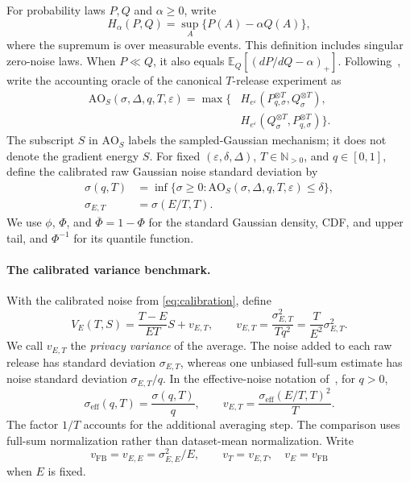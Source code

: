 \documentclass[11pt]{article}
\theoremstyle{remark}
\newcommand{\N}{\mathbb N}
\newcommand{\E}{\mathbb E}
\newcommand{\AO}{\mathrm{AO}}
\begin{document}
For probability laws $P,Q$ and $\alpha\geq0$, write
\[
 H_\alpha(P,Q)=\sup_A\{P(A)-\alpha Q(A)\},
\]
where the supremum is over measurable events. This definition includes
singular zero-noise laws. When $P\ll Q$, it also equals
$\E_Q[(dP/dQ-\alpha)_+]$. Following~\cite{raisa2024}, write the accounting
oracle of the canonical $T$-release experiment as
\begin{equation}\label{eq:canonical-accountant}
 \begin{split}
 \AO_S(\sigma,\Delta,q,T,\varepsilon)=\max\bigl\{&
 H_{e^\varepsilon}(P_{q,\sigma}^{\otimes T},Q_\sigma^{\otimes T}),\\
 &H_{e^\varepsilon}(Q_\sigma^{\otimes T},P_{q,\sigma}^{\otimes T})\bigr\}.
 \end{split}
\end{equation}
The subscript $S$ in $\AO_S$ labels the sampled-Gaussian mechanism; it does
not denote the gradient energy $S$.
For fixed $(\varepsilon,\delta,\Delta)$, $T\in\N_{>0}$, and $q\in[0,1]$,
define the calibrated raw Gaussian noise standard deviation by
\begin{equation}\label{eq:calibration}
 \begin{split}
 \sigma(q,T)&=\inf\{\sigma\geq0:
                  \AO_S(\sigma,\Delta,q,T,\varepsilon)\leq\delta\},\\
 \sigma_{E,T}&=\sigma(E/T,T).
 \end{split}
\end{equation}
We use $\phi$, $\Phi$, and $\overline\Phi=1-\Phi$ for the standard Gaussian
density, CDF, and upper tail, and $\Phi^{-1}$ for its quantile function.

\paragraph{The calibrated variance benchmark.}
With the calibrated noise from \eqref{eq:calibration}, define
\begin{equation}\label{eq:variance}
 V_E(T,S)=\frac{T-E}{ET}S+v_{E,T},
 \qquad v_{E,T}=\frac{\sigma_{E,T}^2}{Tq^2}
                   =\frac{T}{E^2}\sigma_{E,T}^2.
\end{equation}
We call $v_{E,T}$ the \emph{privacy variance} of the average. The noise added
to each raw release has standard deviation $\sigma_{E,T}$, whereas one
unbiased full-sum estimate has noise standard deviation $\sigma_{E,T}/q$.
In the effective-noise notation of~\cite{raisa2024}, for $q>0$,
\begin{equation}\label{eq:effective-noise-normalization}
 \sigma_{\mathrm{eff}}(q,T)=\frac{\sigma(q,T)}q,\qquad
 v_{E,T}=\frac{\sigma_{\mathrm{eff}}(E/T,T)^2}{T}.
\end{equation}
The factor $1/T$ accounts for the additional averaging step. The comparison
uses full-sum normalization rather than dataset-mean normalization. Write
\begin{equation}\label{eq:privacycomponents}
 v_{\mathrm{FB}}=v_{E,E}=\sigma_{E,E}^2/E,
 \qquad v_T=v_{E,T},\quad v_E=v_{\mathrm{FB}}
\end{equation}
when $E$ is fixed.
\end{document}
